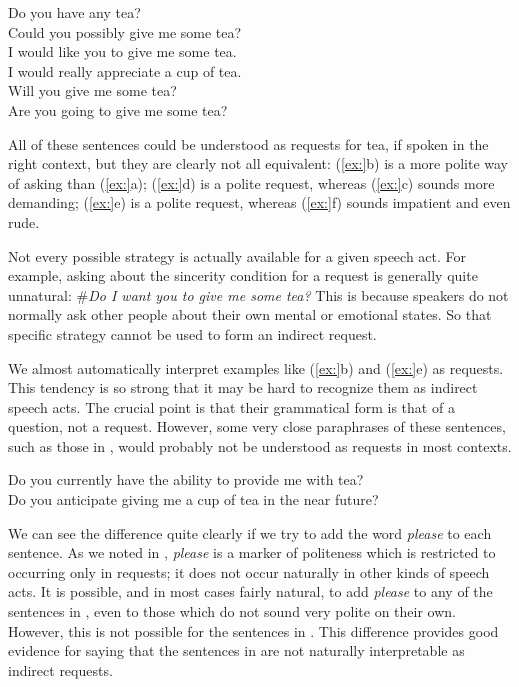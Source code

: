\ea
\ea Do you have any tea?\\
\ex Could you possibly give me some tea?\\
\ex I would like you to give me some tea.\\
\ex I would really appreciate a cup of tea.\\
\ex Will you give me some tea?\\
\ex Are you going to give me some tea?
                       \z
\z


All of these sentences could be understood as requests for tea, if spoken in the right context, but they are clearly not all equivalent: (\ref{ex:}b) is a more polite way of asking than (\ref{ex:}a); (\ref{ex:}d) is a polite request, whereas (\ref{ex:}c) sounds more demanding; (\ref{ex:}e) is a polite request, whereas (\ref{ex:}f) sounds impatient and even rude.



Not every possible strategy is actually available for a given speech act. For example, asking about the sincerity condition for a request is generally quite unnatural: \#\textit{Do I want you to give me some tea?} This is because speakers do not normally ask other people about their own mental or emotional states. So that specific strategy cannot be used to form an indirect request.



We almost automatically interpret examples like (\ref{ex:}b) and (\ref{ex:}e) as requests. This tendency is so strong that it may be hard to recognize them as indirect speech acts. The crucial point is that their grammatical form is that of a question, not a request. However, some very close paraphrases of these sentences, such as those in , would probably not be understood as requests in most contexts.


\ea
\ea Do you currently have the ability to provide me with tea?\\
\ex Do you anticipate giving me a cup of tea in the near future?
                       \z
\z


We can see the difference quite clearly if we try to add the word \textit{please} to each sentence. As we noted in , \textit{please} is a marker of politeness which is restricted to occurring only in requests; it does not occur naturally in other kinds of speech acts. It is possible, and in most cases fairly natural, to add \textit{please} to any of the sentences in , even to those which do not sound very polite on their own. However, this is not possible for the sentences in . This difference provides good evidence for saying that the sentences in  are not naturally interpretable as indirect requests.


